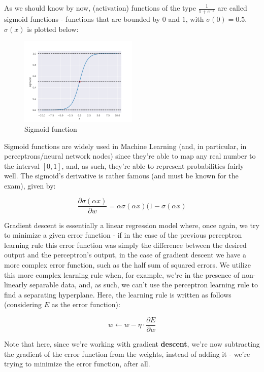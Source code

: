 \documentclass[12pt]{article}
\begin{document}
\begin{enumerate}[leftmargin=\labelsep]
  As we should know by now, (activation) functions of the type $\frac{1}{1 + e^{-k}}$
  are called sigmoid functions - functions that are bounded by $0$ and $1$,
  with $\sigma(0) = 0.5$. $\sigma(x)$ is plotted below:

  \begin{figure}[h]
    \centering
    \includegraphics[width=0.5\textwidth]{assets/sigmoid.png}
    \caption{Sigmoid function}
  \end{figure}

  Sigmoid functions are widely used in Machine Learning (and, in particular, in
  perceptrons/neural network nodes) since they're able to map any real number
  to the interval $[0, 1]$, and, as such, they're able to represent probabilities
  fairly well. The sigmoid's derivative is rather famous (and must be known
  for the exam), given by:

  $$
    \frac{\partial \sigma(\alpha x)}{\partial w} = \alpha \sigma(\alpha x) (1 - \sigma(\alpha x)
  $$

  Gradient descent is essentially a linear regression
  model where, once again, we try to minimize a given error function - if in the case
  of the previous perceptron learning rule this error function was simply the
  difference between the desired output and the perceptron's output, in the case
  of gradient descent we have a more complex error function, such as the half
  sum of squared errors. We utilize this more complex learning rule when, for example,
  we're in the presence of non-linearly separable data, and, as such, we can't
  use the perceptron learning rule to find a separating hyperplane. Here, the
  learning rule is written as follows (considering $E$ as the error function):

  $$
    w \leftarrow w - \eta \cdot \frac{\partial E}{\partial w}
  $$

  Note that here, since we're working with gradient \textbf{descent}, we're now
  subtracting the gradient of the error function from the weights, instead of
  adding it - we're trying to minimize the error function, after all.


\end{enumerate}
\end{document}

